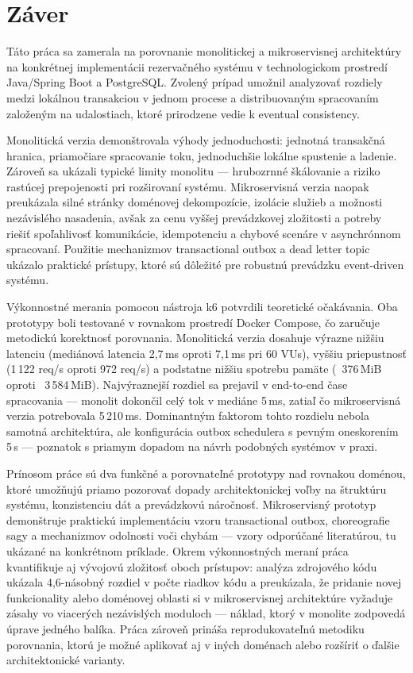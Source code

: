 \chapter{Záver}\label{ch:conclusion}

Táto práca sa zamerala na porovnanie monolitickej a mikroservisnej architektúry na konkrétnej implementácii rezervačného systému v technologickom prostredí Java/Spring Boot a PostgreSQL. Zvolený prípad umožnil analyzovať rozdiely medzi lokálnou transakciou v jednom procese a distribuovaným spracovaním založeným na udalostiach, ktoré prirodzene vedie k eventual consistency.

Monolitická verzia demonštrovala výhody jednoduchosti: jednotná transakčná hranica, priamočiare spracovanie toku, jednoduchšie lokálne spustenie a ladenie. Zároveň sa ukázali typické limity monolitu — hrubozrnné škálovanie a riziko rastúcej prepojenosti pri rozširovaní systému. Mikroservisná verzia naopak preukázala silné stránky doménovej dekompozície, izolácie služieb a možnosti nezávislého nasadenia, avšak za cenu vyššej prevádzkovej zložitosti a potreby riešiť spoľahlivosť komunikácie, idempotenciu a chybové scenáre v asynchrónnom spracovaní. Použitie mechanizmov transactional outbox a dead letter topic ukázalo praktické prístupy, ktoré sú dôležité pre robustnú prevádzku event-driven systému.

Výkonnostné merania pomocou nástroja k6 potvrdili teoretické očakávania. Oba prototypy boli testované v rovnakom prostredí Docker Compose, čo zaručuje metodickú korektnosť porovnania. Monolitická verzia dosahuje výrazne nižšiu latenciu (mediánová latencia 2,7\,ms oproti 7,1\,ms pri 60 VUs), vyššiu priepustnosť (1\,122 req/s oproti 972 req/s) a podstatne nižšiu spotrebu pamäte (~376\,MiB oproti ~3\,584\,MiB). Najvýraznejší rozdiel sa prejavil v end-to-end čase spracovania — monolit dokončil celý tok v mediáne 5\,ms, zatiaľ čo mikroservisná verzia potrebovala 5\,210\,ms. Dominantným faktorom tohto rozdielu nebola samotná architektúra, ale konfigurácia outbox schedulera s pevným oneskorením 5\,s — poznatok s priamym dopadom na návrh podobných systémov v praxi.

Prínosom práce sú dva funkčné a porovnateľné prototypy nad rovnakou doménou, ktoré umožňujú priamo pozorovať dopady architektonickej voľby na štruktúru systému, konzistenciu dát a prevádzkovú náročnosť. Mikroservisný prototyp demonštruje praktickú implementáciu vzoru transactional outbox, choreografie sagy a mechanizmov odolnosti voči chybám — vzory odporúčané literatúrou, tu ukázané na konkrétnom príklade. Okrem výkonnostných meraní práca kvantifikuje aj vývojovú zložitosť oboch prístupov: analýza zdrojového kódu ukázala 4,6-násobný rozdiel v počte riadkov kódu a preukázala, že pridanie novej funkcionality alebo doménovej oblasti si v mikroservisnej architektúre vyžaduje zásahy vo viacerých nezávislých moduloch — náklad, ktorý v monolite zodpovedá úprave jedného balíka. Práca zároveň prináša reprodukovateľnú metodiku porovnania, ktorú je možné aplikovať aj v iných doménach alebo rozšíriť o ďalšie architektonické varianty.

